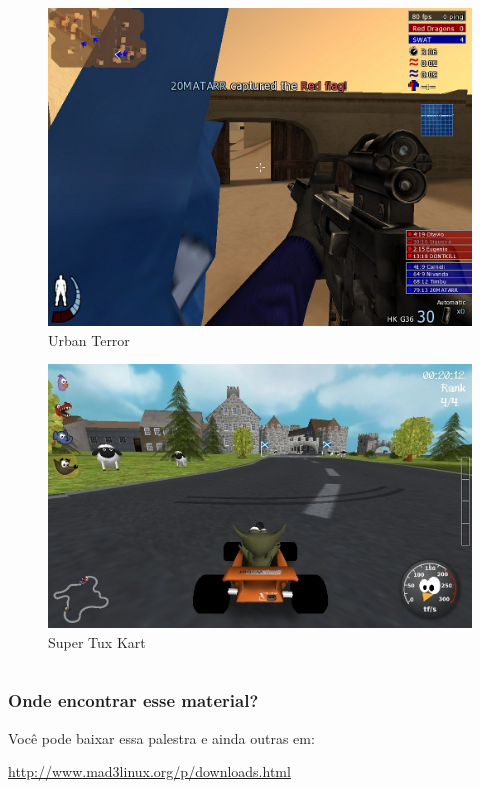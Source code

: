 \begin{frame}
\begin{columns}
	\begin{column}{4cm}
	\begin{figure}
		\includegraphics[scale=0.18]{img/urbanterror.jpg}
		\caption{Urban Terror}
	\end{figure}
	
	\begin{figure}
		\includegraphics[scale=0.18]{img/stk.jpg}
		\caption{Super Tux Kart}
	\end{figure}
	\end{column}
\end{columns}

\end{frame}

\begin{frame}\frametitle{Onde encontrar esse material?}

\begin{center}
Você pode baixar essa palestra e ainda outras em:

\bigskip

\large{\url{http://www.mad3linux.org/p/downloads.html}}
\end{center}

\end{frame}

